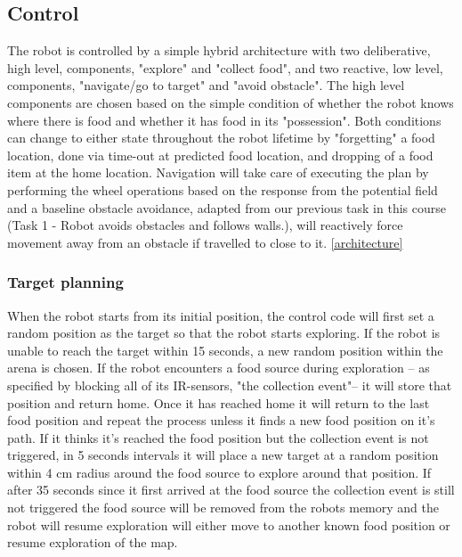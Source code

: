 \documentclass[paper=a4, fontsize=12pt]{scrartcl}	%
\numberwithin{equation}{section}		%
\numberwithin{figure}{section}			%
\numberwithin{table}{section}				%
\begin{document}
\subsection{Control}
The robot is controlled by a simple hybrid architecture with two deliberative, high level, components, "explore" and "collect food", and two reactive, low level, components, "navigate/go to target" and "avoid obstacle". The high level components are chosen based on the simple condition of whether the robot knows where there is food and whether it has food in its "possession". Both conditions can change to either state throughout the robot lifetime by "forgetting" a food location, done via time-out at predicted food location, and dropping of a food item at the home location. Navigation will take care of executing the plan by performing the wheel operations based on the response from the potential field and a baseline obstacle avoidance, adapted from our previous task in this course (Task 1 - Robot avoids obstacles and follows walls.), will reactively force movement away from an obstacle if travelled to close to it. \ref{architecture}
\subsubsection{Target planning}
When the robot starts from its initial position, the control code will first set a random position as the target so that the robot starts exploring. If the robot is unable to reach the target within 15 seconds, a new random position within the arena is chosen. If the robot encounters a food source during exploration – as specified by blocking all of its IR-sensors, "the collection event"– it will store that position and return home. Once it has reached home it will return to the last food position and repeat the process unless it finds a new food position on it's path. If it thinks it's reached the food position but the collection event is not triggered, in 5 seconds intervals it will place a new target at a random position within 4 cm radius around the food source to explore around that position. If after 35 seconds since it first arrived at the food source the collection event is still not triggered the food source will be removed from the robots memory and the robot will resume exploration will either move to another known food position or resume exploration of the map. 
\end{document}
